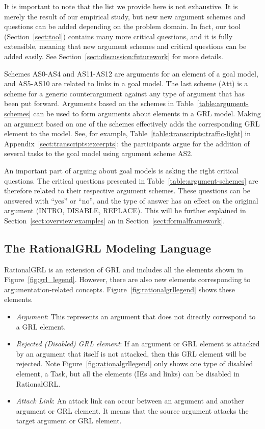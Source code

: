 It is important to note that the list we provide here is not exhaustive. It is merely the result of our empirical study, but new new argument schemes and questions can be added depending on the problem domain. In fact, our tool (Section~\ref{sect:tool}) contains many more critical questions, and it is fully extensible, meaning that new argument schemes and critical questions can be added easily. See Section~\ref{sect:discussion:futurework} for more details.

Schemes AS0-AS4 and AS11-AS12 are arguments for an element of a goal model, and AS5-AS10 are related to links in a goal model. The last scheme (Att) is a scheme for a generic counterargument against any type of argument that has been put forward. Arguments based on the schemes in Table~\ref{table:argument-schemes} can be used to form arguments about elements in a GRL model. Making an argument based on one of the schemes effectively adds the corresponding GRL element to the model. See, for example, Table~\ref{table:transcripts:traffic-light} in Appendix~\ref{sect:transcripts:excerpts}: the participants argue for the addition of several tasks to the goal model using argument scheme AS2. 

An important part of arguing about goal models is asking the right critical questions. The critical questions presented in Table~\ref{table:argument-schemes} are therefore related to their respective argument schemes. These questions can be answered with ``yes'' or ``no'', and the type of answer has an effect on the original argument (\textsf{INTRO}, \textsf{DISABLE}, \textsf{REPLACE}). This will be further explained in Section~\ref{sect:overview:examples} an in Section~\ref{sect:formalframework}.


\subsection{The RationalGRL Modeling Language}
\label{sect:overview:lang}
\label{sect:metamodel}
RationalGRL is an extension of GRL and includes all the elements shown in Figure~\ref{fig:grl_legend}. However, there are also new elements corresponding to argumentation-related concepts. Figure~\ref{fig:rationalgrllegend} shows these elements. 
\begin{itemize}
\item \emph{Argument}: This represents an argument that does not directly correspond to a GRL element.  
\item \emph{Rejected (Disabled) GRL element}: If an argument or GRL element is attacked by an argument that itself is not attacked, then this GRL element will be rejected. Note Figure~\ref{fig:rationalgrllegend} only shows one type of disabled element, a Task, but all the elements (IEs and links) can be disabled in RationalGRL.
\item \emph{Attack Link}: An attack link can occur between an argument and another argument or GRL element. It means that the source argument attacks the target argument or GRL element.
\end{itemize} 

